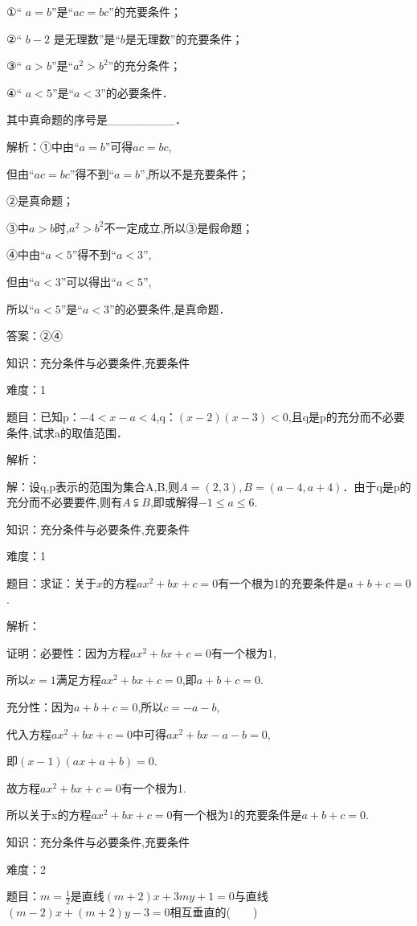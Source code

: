 \documentclass{article} %
\begin{document}
①`` $a=b$''是``$ac=bc$''的充要条件；

②`` $b-2$ 是无理数''是``$b$是无理数''的充要条件；

③`` $a>b$''是``$a^{2}>b^{2}$''的充分条件；

④`` $a<5$''是``$a<3$''的必要条件．

其中真命题的序号是\_\_\_\_\_\_\_\_．

解析：①中由``$a=b$''可得$ac=bc$,

但由``$ac=bc$''得不到``$a=b$'',所以不是充要条件；

②是真命题；

③中$a>b$时,$a^{2}>b^{2}$不一定成立,所以③是假命题；

④中由``$a<5$''得不到``$a<3$'',

但由``$a<3$''可以得出``$a<5$'',

所以``$a<5$''是``$a<3$''的必要条件,是真命题．

答案：②④



知识：充分条件与必要条件,充要条件

难度：1

题目：已知p：$-4<x-a<4$,q：$(x-2)(x-3)<0$,且q是p的充分而不必要条件,试求a的取值范围．

解析：

解：设q,p表示的范围为集合A,B,则$A=(2,3),B=(a-4,a+4)$．由于q是p的充分而不必要要件,则有$A\subsetneqq B$,即或解得$-1\le a\le 6$.



知识：充分条件与必要条件,充要条件

难度：1

题目：求证：关于$x$的方程$ax^{2}+bx+c=0$有一个根为1的充要条件是$a+b+c=0$.

解析：

证明：必要性：因为方程$ax^{2}+bx+c=0$有一个根为1,

所以$x=1$满足方程$ax^{2}+bx+c=0$,即$a+b+c=0$.

充分性：因为$a+b+c=0$,所以$c=-a-b$,

代入方程$ax^{2}+bx+c=0$中可得$ax^{2}+bx-a-b=0$,

即$(x-1)(ax+a+b)=0$.

故方程$ax^{2}+bx+c=0$有一个根为1.

所以关于x的方程$ax^{2}+bx+c=0$有一个根为1的充要条件是$a+b+c=0$.



知识：充分条件与必要条件,充要条件

难度：2

题目：$m=\frac{1}{2}$是直线$(m+2)x+3my+1=0$与直线$(m-2)x+(m+2)y-3=0$相互垂直的(　　)
\end{document}
